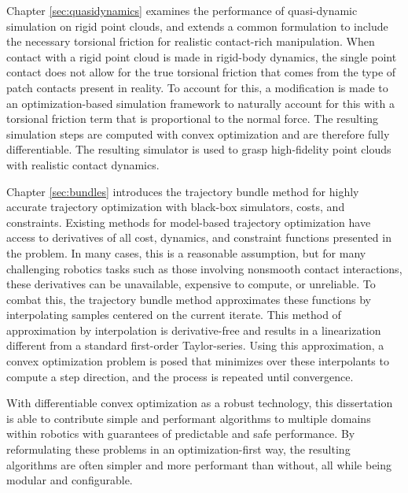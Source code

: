 Chapter \ref{sec:quasidynamics} examines the performance of quasi-dynamic simulation on rigid point clouds, and extends a common formulation to include the necessary torsional friction for realistic contact-rich manipulation. When contact with a rigid point cloud is made in rigid-body dynamics, the single point contact does not allow for the true torsional friction that comes from the type of patch contacts present in reality. To account for this, a modification is made to an optimization-based simulation framework to naturally account for this with a torsional friction term that is proportional to the normal force. The resulting simulation steps are computed with convex optimization and are therefore fully differentiable. The resulting simulator is used to grasp high-fidelity point clouds with realistic contact dynamics. 

Chapter \ref{sec:bundles} introduces the trajectory bundle method for highly accurate trajectory optimization with black-box simulators, costs, and constraints.  Existing methods for model-based trajectory optimization have access to derivatives of all cost, dynamics, and constraint functions presented in the problem. In many cases, this is a reasonable assumption, but for many challenging robotics tasks such as those involving nonsmooth contact interactions, these derivatives can be unavailable, expensive to compute, or unreliable. To combat this, the trajectory bundle method approximates these functions by interpolating samples centered on the current iterate. This method of approximation by interpolation is derivative-free and results in a linearization different from a standard first-order Taylor-series. Using this approximation, a convex optimization problem is posed that minimizes over these interpolants to compute a step direction, and the process is repeated until convergence.

With differentiable convex optimization as a robust technology, this dissertation is able to contribute simple and performant algorithms to multiple domains within robotics with guarantees of predictable and safe performance. By reformulating these problems in an optimization-first way, the resulting algorithms are often simpler and more performant than without, all while being modular and configurable.


